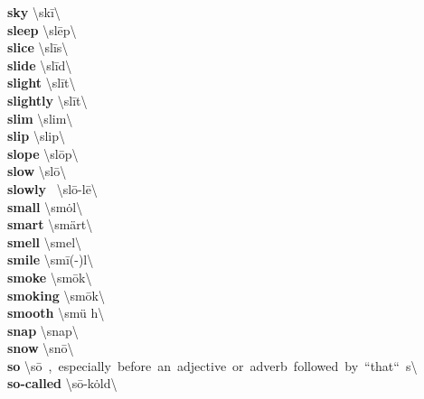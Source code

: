 \documentclass[10pt,a4paper]{article}
\begin{document}
\begin{multicols}{2}
\textbf{ sky }\quad \textbackslash \textprimstress sk\={i}\textbackslash \\
\textbf{ sleep }\quad \textbackslash \textprimstress sl\={e}p\textbackslash \\
\textbf{ slice }\quad \textbackslash \textprimstress sl\={i}s\textbackslash \\
\textbf{ slide }\quad \textbackslash \textprimstress sl\={i}d\textbackslash \\
\textbf{ slight }\quad \textbackslash \textprimstress sl\={i}t\textbackslash \\
\textbf{ slightly }\quad \textbackslash \textprimstress sl\={i}t\textbackslash \\
\textbf{ slim }\quad \textbackslash \textprimstress slim\textbackslash \\
\textbf{ slip }\quad \textbackslash \textprimstress slip\textbackslash \\
\textbf{ slope }\quad \textbackslash \textprimstress sl\={o}p\textbackslash \\
\textbf{ slow }\quad \textbackslash \textprimstress sl\={o}\textbackslash \\
\textbf{ slowly }\quad \ \textbackslash \textprimstress sl\={o}-l\={e}\textbackslash \\
\textbf{ small }\quad \textbackslash \textprimstress sm\.{o}l\textbackslash \\
\textbf{ smart }\quad \textbackslash \textprimstress sm\"{a}rt\textbackslash \\
\textbf{ smell }\quad \textbackslash \textprimstress smel\textbackslash \\
\textbf{ smile }\quad \textbackslash \textprimstress sm\={i}(-\textschwa )l\textbackslash \\
\textbf{ smoke }\quad \textbackslash \textprimstress sm\={o}k\textbackslash \\
\textbf{ smoking }\quad \textbackslash \textprimstress sm\={o}k\textbackslash \\
\textbf{ smooth }\quad \textbackslash \textprimstress sm\"{u} h\textbackslash \\
\textbf{ snap }\quad \textbackslash \textprimstress snap\textbackslash \\
\textbf{ snow }\quad \textbackslash \textprimstress sn\={o}\textbackslash \\
\textbf{ so }\quad \textbackslash \textprimstress s\={o}\ ,\ especially\ before\ an\ adjective\ or\ adverb\ followed\ by\ ``that``\ s\textschwa \textbackslash \\
\textbf{ so-called }\quad \textbackslash \textprimstress s\={o}-\textprimstress k\.{o}ld\textbackslash \\

\end{multicols}
\end{document}

